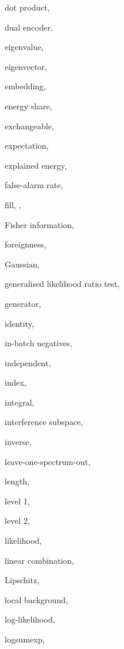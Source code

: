 \documentclass[11pt,a4paper,oneside,openany]{book}
\begin{document}
\begin{theindex}
  \item dot product, 
  \item dual encoder, 
  \indexspace
  \item eigenvalue, 
  \item eigenvector, 
  \item embedding, 
  \item energy share, 
  \item exchangeable, 
  \item expectation, 
  \item explained energy, 
  \indexspace
  \item false-alarm rate, 
  \item fill, , 
  \item Fisher information, 
  \item foreignness, 
  \indexspace
  \item Gaussian, 
  \item generalised likelihood ratio test, 
  \item generator, 
  \indexspace
  \item identity, 
  \item in-batch negatives, 
  \item independent, 
  \item index, 
  \item integral, 
  \item interference subspace, 
  \item inverse, 
  \indexspace
  \item leave-one-spectrum-out, 
  \item length, 
  \item level 1, 
  \item level 2, 
  \item likelihood, 
  \item linear combination, 
  \item Lipschitz, 
  \item local background, 
  \item log-likelihood, 
  \item logsumexp, 

\end{theindex}
\end{document}
